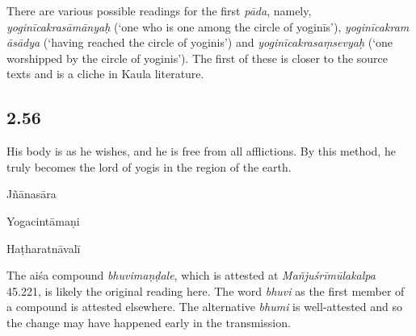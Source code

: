 \begin{ekdosis}
\begin{philcomm}[hp02_055]
There are various possible readings for the first \emph{pāda}, namely, \emph{yoginīcakrasāmānyaḥ} (‘one who is one among the circle of yoginīs'), \emph{yoginīcakram āsādya} (‘having reached the circle of yoginis’) and \emph{yoginīcakrasaṃsevyaḥ} (‘one worshipped by the circle of yoginis’). The first of these is closer to the source texts and is a cliche in Kaula literature.
\end{philcomm}

\subsection*{2.56}
\begin{translation}[hp02_056]
His body is as he wishes, and he is free from all afflictions. By this method, he truly becomes the lord of yogis in the region of the earth.
\end{translation}

\begin{sources}[hp02_056]
Jñānasāra

\begin{versinnote}
\end{versinnote}
\end{sources}

\begin{testimonia}[hp02_056]
Yogacintāmaṇi

\begin{versinnote}
\end{versinnote}

Haṭharatnāvalī

\begin{versinnote}
\end{versinnote}
\end{testimonia}

\begin{philcomm}[hp02_056]
The aiśa compound \emph{bhuvimaṇḍale}, which is attested at \emph{Mañjuśrīmūlakalpa} 45.221, is likely the original reading here. The word  \emph{bhuvi} as the first member of a compound is attested elsewhere. The alternative \emph{bhumi} is well-attested and so the change may have happened early in the transmission. 
\end{philcomm}


\end{ekdosis}
